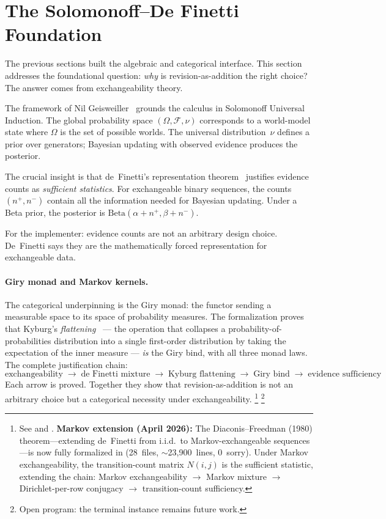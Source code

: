 \documentclass[11pt,openany]{report}
\begin{document}
\section{The Solomonoff--De Finetti Foundation}

The previous sections built the algebraic and categorical interface.
This section addresses the foundational question: \emph{why} is
revision-as-addition the right choice?  The answer comes from
exchangeability theory.

The \nuPLN{} framework of Nil Geisweiller~\cite{nuPLN2026} grounds the
calculus in Solomonoff Universal Induction.  The global probability
space $(\Omega, \mathcal{F}, \nu)$ corresponds to a world-model state
where $\Omega$ is the set of possible worlds.  The universal
distribution~$\nu$ defines a prior over generators; Bayesian updating
with observed evidence produces the posterior.

The crucial insight is that de~Finetti's representation
theorem~\cite{definetti1937} justifies evidence counts as
\emph{sufficient statistics}.  For exchangeable binary sequences, the
counts $(n^+, n^-)$ contain all the information needed for Bayesian
updating.  Under a Beta prior, the posterior is
$\text{Beta}(\alpha + n^+, \beta + n^-)$.

For the implementer: evidence counts are not an arbitrary design
choice.  De~Finetti says they are the mathematically forced
representation for exchangeable data.

\paragraph{Giry monad and Markov kernels.}
The categorical underpinning is the Giry monad: the functor sending
a measurable space to its space of probability measures.  The
formalization proves that Kyburg's \emph{flattening}~\cite{Kyburg1988}
--- the operation that collapses a probability-of-probabilities
distribution into a single first-order distribution by taking the
expectation of the inner measure --- \emph{is} the Giry bind,
with all three monad laws.  The complete justification chain:
\[
  \text{exchangeability}
  \;\to\; \text{de Finetti mixture}
  \;\to\; \text{Kyburg flattening}
  \;\to\; \text{Giry bind}
  \;\to\; \text{evidence sufficiency}
\]
Each arrow is proved.  Together they show that revision-as-addition
is not an arbitrary choice but a categorical necessity under
exchangeability.%
\footnote{See
and
.
\textbf{Markov extension (April 2026):} The Diaconis--Freedman (1980)
theorem---extending de~Finetti from i.i.d.\ to Markov-exchangeable
sequences---is now fully formalized in
 (28~files,
${\sim}$23{,}900~lines, 0~sorry).  Under Markov exchangeability, the
transition-count matrix $N(i,j)$ is the sufficient statistic,
extending the chain: Markov exchangeability $\to$ Markov mixture
$\to$ Dirichlet-per-row conjugacy $\to$ transition-count sufficiency.
}%
\footnote{Open program: the terminal
 instance remains future
work.}
\end{document}
